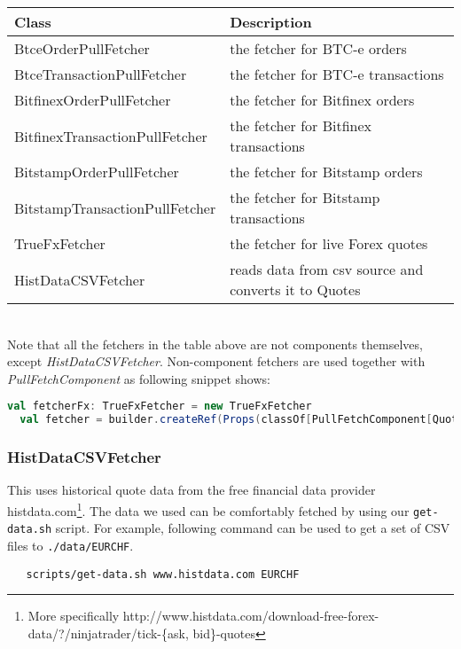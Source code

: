 \noindent
\begin{tabularx}{\textwidth}{|l|X|}
  \hline
  Class & Description  \\
  \hline
  BtceOrderPullFetcher & the fetcher for BTC-e orders \\
  \hline
  BtceTransactionPullFetcher  & the fetcher for BTC-e transactions  \\
  \hline
  BitfinexOrderPullFetcher & the fetcher for Bitfinex orders  \\
  \hline
  BitfinexTransactionPullFetcher & the fetcher for Bitfinex transactions  \\
  \hline
  BitstampOrderPullFetcher & the fetcher for Bitstamp orders  \\
  \hline
  BitstampTransactionPullFetcher & the fetcher for Bitstamp transactions \\
  \hline
  TrueFxFetcher & the fetcher for  live Forex quotes  \\
  \hline
  HistDataCSVFetcher & reads data from csv source and converts it to Quotes \\
  \hline
\end{tabularx}\\[0.3cm]

Note that all the fetchers in the table above are not components themselves, except \emph{HistDataCSVFetcher}. Non-component fetchers are used together with \emph{PullFetchComponent} as following snippet shows:

\begin{lstlisting}[language=Scala]
  val fetcherFx: TrueFxFetcher = new TrueFxFetcher
  val fetcher = builder.createRef(Props(classOf[PullFetchComponent[Quote]], fetcherFx, implicitly[ClassTag[Quote]]), "TrueFxFetcher")
\end{lstlisting}

\subsubsection{HistDataCSVFetcher}

This uses historical quote data from the free financial data provider histdata.com\footnote{More specifically http://www.histdata.com/download-free-forex-data/?/ninjatrader/tick-\{ask, bid\}-quotes}. The data we used can be comfortably fetched by using our \texttt{get-data.sh} script. For example,  following command can be used to get a set of CSV files to  \lstinline|./data/EURCHF|.

\begin{verbatim}
   scripts/get-data.sh www.histdata.com EURCHF
\end{verbatim}

